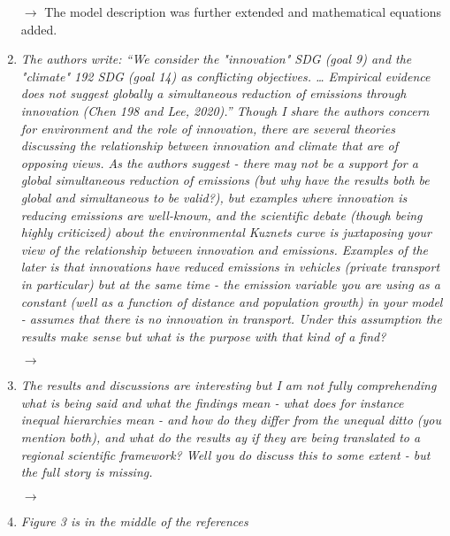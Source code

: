 \documentclass[10pt,a4paper,sans]{moderncv}        %
\begin{document}
\begin{enumerate}
    \medskip
    
    $\rightarrow$ The model description was further extended and mathematical equations added.

    \bigskip
    

    \item \textit{The authors write: ``We consider the "innovation" SDG (goal 9) and the "climate" 192 SDG (goal 14) as conflicting objectives. … Empirical evidence does not suggest globally a simultaneous reduction of emissions through innovation (Chen 198 and Lee, 2020).'' Though I share the authors concern for environment and the role of innovation, there are several theories discussing the relationship between innovation and climate that are of opposing views. As the authors suggest - there may not be a support for a global simultaneous reduction of emissions (but why have the results both be global and simultaneous to be valid?), but examples where innovation is reducing emissions are well-known, and the scientific debate (though being highly criticized) about the environmental Kuznets curve is juxtaposing your view of the relationship between innovation and emissions. Examples of the later is that innovations have reduced emissions in vehicles (private transport in particular) but at the same time - the emission variable you are using as a constant (well as a function of distance and population growth) in your model - assumes that there is no innovation in transport. Under this assumption the results make sense but what is the purpose with that kind of a find?}
    
    \medskip
    
    $\rightarrow$
    
    \bigskip
    
    \item \textit{The results and discussions are interesting but I am not fully comprehending what is being said and what the findings mean - what does for instance inequal hierarchies mean - and how do they differ from the unequal ditto (you mention both), and what do the results ay if they are being translated to a regional scientific framework? Well you do discuss this to some extent - but the full story is missing.}
    
    \medskip
    
    $\rightarrow$

    \bigskip
    
    \item \textit{Figure 3 is in the middle of the references}

\end{enumerate}
\end{document}
